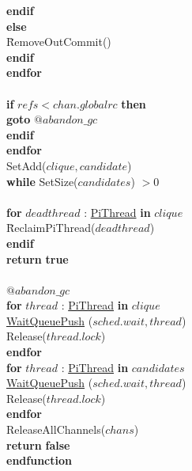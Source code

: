 \documentclass[a4paper,11pt]{article}
\newenvironment{program}{
  \begin{sffamily}
  \begin{scriptsize}
  \begin{tabbing}}
 {\end{tabbing}
  \end{scriptsize}
  \end{sffamily}}
\newcommand{\kw}[1]{\textsf{\textbf{#1}}}
\newcommand{\pindent}{\hspace{2em}\=}
\newcommand{\synchro}[1]{\textcolor{synchrocolor}{#1}}
\newcommand{\myref}[1]{
  \hyperref[#1]{#1}
}
\begin{document}
\begin{program}
  \>\>\>\>\>\kw{endif} \\
  \>\>\>\>\kw{else} \\
  \>\>\>\>\pindent RemoveOutCommit() \\
  \>\>\>\>\kw{endif} \\
  \>\>\>\kw{endfor} \\
  \>\>\> \\
  \>\>\>\kw{if} $refs < chan.globalrc$ \kw{then} \\
  \>\>\>\pindent\kw{goto} $@abandon\_gc$ \\
  \>\>\>\kw{endif} \\
  \>\>\kw{endfor} \\
  \>\>SetAdd($clique, candidate$) \\
  \>\kw{while} SetSize($candidates$) $> 0$ \\
  \> \\
  \>\kw{for} $deadthread$ : \myref{PiThread} \kw{in} $clique$ \\
  \>\pindent ReclaimPiThread($deadthread$) \\
  \>\kw{endif} \\
  \>\kw{return} \kw{true} \\
  \> \\
  \>$@abandon\_gc$ \\
  \>\kw{for} $thread$ : \myref{PiThread} \kw{in} $clique$ \\
  \>\pindent\synchro{\myref{WaitQueuePush}($sched.wait, thread$)} \\
  \>\>\synchro{Release($thread.lock$)} \\
  \>\kw{endfor} \\
  \>\kw{for} $thread$ : \myref{PiThread} \kw{in} $candidates$ \\
  \>\pindent\synchro{\myref{WaitQueuePush}($sched.wait, thread$)} \\
  \>\>\synchro{Release($thread.lock$)} \\
  \>\kw{endfor} \\
  \>\synchro{ReleaseAllChannels($chans$)} \\
  \>\kw{return} \kw{false} \\
  \kw{endfunction}
\end{program}
\end{document}
